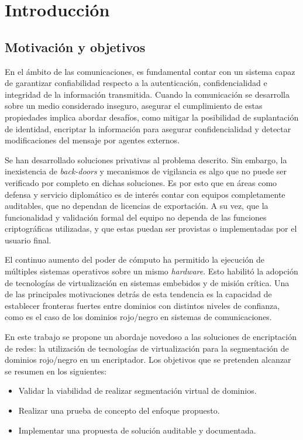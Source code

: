 \chapter{Introducción}
\section{Motivación y objetivos}
En el ámbito de las comunicaciones, es fundamental contar con un sistema capaz de garantizar confiabilidad respecto a la autenticación, confidencialidad e integridad de la información transmitida. Cuando la comunicación se desarrolla sobre un medio considerado inseguro, asegurar el cumplimiento de estas propiedades implica abordar desafíos, como mitigar la posibilidad de suplantación de identidad, encriptar la información para asegurar confidencialidad y detectar modificaciones del mensaje por agentes externos.

Se han desarrollado soluciones privativas al problema descrito. Sin embargo, la inexistencia de \textit{back-doors} y mecanismos de vigilancia es algo que no puede ser verificado por completo en dichas soluciones. Es por esto que en áreas como defensa y servicio diplomático es de interés contar con equipos completamente auditables, que no dependan de licencias de exportación. A su vez, que la funcionalidad y validación formal del equipo no dependa de las funciones criptográficas utilizadas, y que estas puedan ser provistas o implementadas por el usuario final.

El continuo aumento del poder de cómputo ha permitido la ejecución de múltiples sistemas operativos sobre un mismo \textit{hardware}. Esto habilitó la adopción de tecnologías de virtualización en sistemas embebidos y de misión crítica. Una de las principales motivaciones detrás de esta tendencia es la capacidad de establecer fronteras fuertes entre dominios con distintos niveles de confianza, como es el caso de los dominios rojo/negro en sistemas de comunicaciones.

En este trabajo se propone un abordaje novedoso a las soluciones de encriptación de redes: la utilización de tecnologías de virtualización para la segmentación de dominios rojo/negro en un encriptador. Los objetivos que se pretenden alcanzar se resumen en los siguientes:
\begin{itemize}
    \item Validar la viabilidad de realizar segmentación virtual de dominios.
    \item Realizar una prueba de concepto del enfoque propuesto.
    \item Implementar una propuesta de solución auditable y documentada.
\end{itemize}

